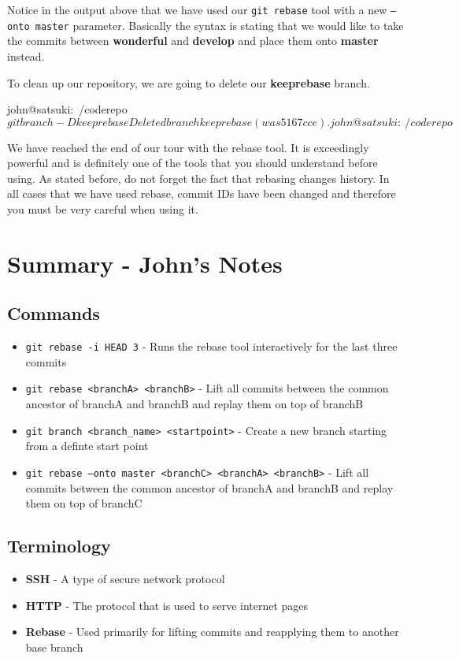 Notice in the output above that we have used our \texttt{git rebase} tool with a new \texttt{--onto master} parameter.  Basically the syntax is stating that we would like to take the commits between \textbf{wonderful} and \textbf{develop} and place them onto \textbf{master} instead.

To clean up our repository, we are going to delete our \textbf{keeprebase} branch.

\begin{code}
john@satsuki:~/coderepo$ git branch -D keeprebase
Deleted branch keeprebase (was 5167cce).
john@satsuki:~/coderepo$ 
\end{code}

We have reached the end of our tour with the rebase tool.  It is exceedingly powerful and is definitely one of the tools that you should understand before using.  As stated before, do not forget the fact that rebasing changes history.  In all cases that we have used rebase, commit IDs have been changed and therefore you must be very careful when using it.

\clearpage

\section{Summary - John's Notes}
\subsection{Commands}
\begin{itemize}

\item\texttt{git rebase -i HEAD~3} - Runs the rebase tool interactively for the last three commits 

\item\texttt{git rebase <branchA> <branchB>} - Lift all commits between the common ancestor of branchA and branchB and replay them on top of branchB

\item\texttt{git branch <branch\_name> <startpoint>} - Create a new branch starting from a definte start point

\item\texttt{git rebase --onto master <branchC> \newline <branchA> <branchB>} - Lift all commits between the common ancestor of branchA and branchB and replay them on top of branchC
\end{itemize}

\subsection{Terminology}
\begin{itemize}
\item\textbf{SSH} - A type of secure network protocol
\item\textbf{HTTP} - The protocol that is used to serve internet pages
\item\textbf{Rebase} - Used primarily for lifting commits and reapplying them to another base branch
\end{itemize}
